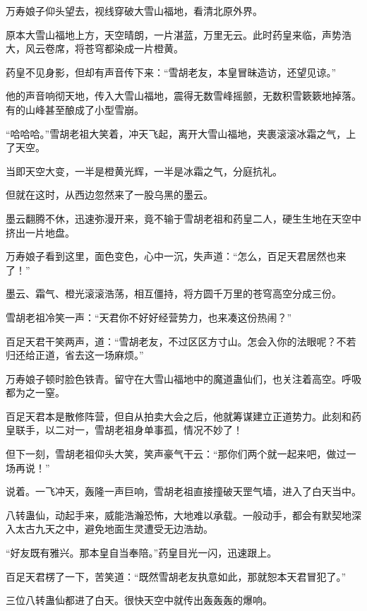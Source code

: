 
\begin{this_body}

万寿娘子仰头望去，视线穿破大雪山福地，看清北原外界。

原本大雪山福地上方，天空晴朗，一片湛蓝，万里无云。此时药皇来临，声势浩大，风云卷席，将苍穹都染成一片橙黄。

药皇不见身影，但却有声音传下来：“雪胡老友，本皇冒昧造访，还望见谅。”

他的声音响彻天地，传入大雪山福地，震得无数雪峰摇颤，无数积雪簌簌地掉落。有的山峰甚至酿成了小型雪崩。

“哈哈哈。”雪胡老祖大笑着，冲天飞起，离开大雪山福地，夹裹滚滚冰霜之气，上了天空。

当即天空大变，一半是橙黄光辉，一半是冰霜之气，分庭抗礼。

但就在这时，从西边忽然来了一股乌黑的墨云。

墨云翻腾不休，迅速弥漫开来，竟不输于雪胡老祖和药皇二人，硬生生地在天空中挤出一片地盘。

万寿娘子看到这里，面色变色，心中一沉，失声道：“怎么，百足天君居然也来了！”

墨云、霜气、橙光滚滚浩荡，相互僵持，将方圆千万里的苍穹高空分成三份。

雪胡老祖冷笑一声：“天君你不好好经营势力，也来凑这份热闹？”

百足天君干笑两声，道：“雪胡老友，不过区区方寸山。怎会入你的法眼呢？不若归还给正道，省去这一场麻烦。”

万寿娘子顿时脸色铁青。留守在大雪山福地中的魔道蛊仙们，也关注着高空。呼吸都为之一窒。

百足天君本是散修阵营，但自从拍卖大会之后，他就筹谋建立正道势力。此刻和药皇联手，以二对一，雪胡老祖身单事孤，情况不妙了！

但下一刻，雪胡老祖仰头大笑，笑声豪气干云：“那你们两个就一起来吧，做过一场再说！”

说着。一飞冲天，轰隆一声巨响，雪胡老祖直接撞破天罡气墙，进入了白天当中。

八转蛊仙，动起手来，威能浩瀚恐怖，大地难以承载。一般动手，都会有默契地深入太古九天之中，避免地面生灵遭受无边浩劫。

“好友既有雅兴。那本皇自当奉陪。”药皇目光一闪，迅速跟上。

百足天君楞了一下，苦笑道：“既然雪胡老友执意如此，那就恕本天君冒犯了。”

三位八转蛊仙都进了白天。很快天空中就传出轰轰轰的爆响。


\end{this_body}
